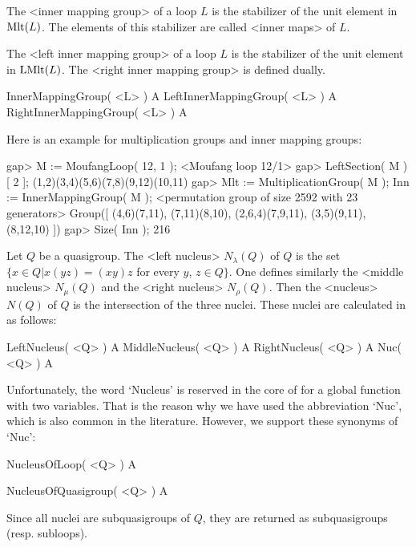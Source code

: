 
The <inner mapping group>
%
%
 of a loop $L$ is the stabilizer of the
unit element in ${\rm{Mlt}}(L)$. The elements of this stabilizer are called
<inner maps> of $L$.

The <left inner mapping group>
%
%
 of a loop $L$ is the stabilizer of the unit
element in ${\rm{LMlt}}(L)$. The <right inner mapping group>
%
%
 is defined dually.

\>InnerMappingGroup( <L> ) A
\>LeftInnerMappingGroup( <L> ) A
\>RightInnerMappingGroup( <L> ) A

Here is an example for multiplication groups and inner mapping groups:

\beginexample
gap> M := MoufangLoop( 12, 1 );
<Moufang loop 12/1>
gap> LeftSection( M )[ 2 ];
(1,2)(3,4)(5,6)(7,8)(9,12)(10,11)
gap> Mlt := MultiplicationGroup( M ); Inn := InnerMappingGroup( M );
<permutation group of size 2592 with 23 generators>
Group([ (4,6)(7,11), (7,11)(8,10), (2,6,4)(7,9,11), (3,5)(9,11), (8,12,10) ])
gap> Size( Inn );
216
\endexample


Let $Q$ be a quasigroup. The <left nucleus>
%
%
 $N_\lambda(Q)$ of $Q$ is the
set $\{x\in Q| x(yz)=(xy)z$ for every $y$, $z\in Q\}$. One defines similarly
the <middle nucleus>
%
%
 $N_\mu(Q)$ and the <right nucleus>
%
%
 $N_\rho(Q)$.
Then the <nucleus>
%
%
 $N(Q)$ of $Q$ is the intersection of the three nuclei.
These nuclei are calculated in {\LOOPS} as follows:

\>LeftNucleus( <Q> ) A
\>MiddleNucleus( <Q> ) A
\>RightNucleus( <Q> ) A
\>Nuc( <Q> ) A

Unfortunately, the word `Nucleus' is reserved in the core of {\GAP} for a
global function with two variables. That is the reason why we have used the
abbreviation `Nuc', which is also common in the literature. However, we support
these synonyms of `Nuc':

\>NucleusOfLoop( <Q> ) A

\>NucleusOfQuasigroup( <Q> ) A

Since all nuclei are subquasigroups of $Q$, they are returned as subquasigroups
(resp. subloops).

